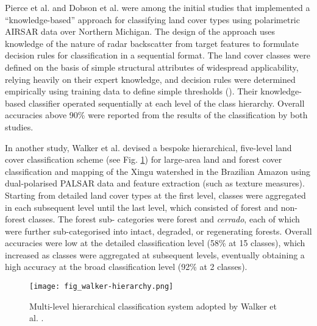 Pierce et al. \citeyearpar{pierce_knowledge-based_1994} and Dobson et al. \citeyearpar{dobson_knowledge-based_1996} were among the initial studies that implemented a \enquote{knowledge-based} approach for classifying land cover types using polarimetric AIRSAR data over Northern Michigan. The design of the approach uses knowledge of the nature of radar backscatter from target features to formulate decision rules for classification in a sequential format. The land cover classes were defined on the basis of simple structural attributes of widespread applicability, relying heavily on their expert knowledge, and decision rules were determined empirically using training data to define simple thresholds (\cite{dobson_knowledge-based_1996}). Their knowledge-based classifier operated sequentially at each level of the class hierarchy. Overall accuracies above 90\% were reported from the results of the classification by both studies.

In another study, Walker et al. \citeyearpar{walker_large-area_2010} devised a bespoke hierarchical, five-level land cover classification scheme (see Fig. \ref{fig: litrev-fig2.1}) for large-area land and forest cover classification and mapping of the Xingu watershed in the Brazilian Amazon using dual-polarised PALSAR data and feature extraction (such as texture measures). Starting from detailed land cover types at the first level, classes were aggregated in each subsequent level until the last level, which consisted of forest and non-forest classes. The forest sub- categories were forest and \textit{cerrado}, each of which were further sub-categorised into intact, degraded, or regenerating forests. Overall accuracies were low at the detailed classification level (58\% at 15 classes), which increased as classes were aggregated at subsequent levels, eventually obtaining a high accuracy at the broad classification level (92\% at 2 classes).

\begin{figure}
	\centering
	\texttt{[image: fig\_walker-hierarchy.png]}
	\caption[Multi-level hierarchical classification system.]{Multi-level hierarchical classification system adopted by Walker et al. \citeyearpar{walker_large-area_2010}.}
	\label{fig: litrev-fig2.1}
\end{figure}

